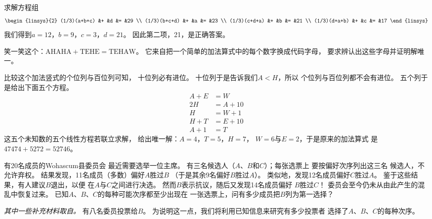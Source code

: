\begin{exercises}
\begin{exparts*}
    \end{exparts*}
    \begin{answer}
      求解方程组
      \begin{equation*}
        \begin{linsys}{2}
        (1/3)(a+b+c)  &+  &d  &=  &29  \\
        (1/3)(b+c+d)  &+  &a  &=  &23  \\
        (1/3)(c+d+a)  &+  &b  &=  &21  \\
        (1/3)(d+a+b)  &+  &c  &=  &17
        \end{linsys}
      \end{equation*}
      我们得到$a=12$，$b=9$，$c=3$，$d=21$。
      因此第二项，21，是正确答案。
     \end{answer}
  \puzzle \item  
      \cite{Monthly35p47}
      笑一笑这个：\( \mbox{AHAHA}+\mbox{TEHE}=\mbox{TEHAW} \)。
      它来自把一个简单的加法算式中的每个数字换成代码字母，
      要求辨认出这些字母并证明解唯一。
      \begin{answer}
        \answerasgiven
        比较这个加法竖式的个位列与百位列可知，
        十位列必有进位。
        十位列于是告诉我们\( A<H \)，所以
        个位列与百位列都不会有进位。
        五个列于是给出下面五个方程。
        \begin{align*}
          A+E  &=  W  \\
          2H   &=  A+10  \\
          H    &=  W+1  \\
          H+T  &=  E+10  \\
          A+1  &=  T
        \end{align*}
        这五个未知数的五个线性方程若联立求解，
        给出唯一解：\( A=4 \)，\( T=5 \)，\( H=7 \)，
        \( W=6 \)与\( E=2 \)，于是原来的加法算式
        是\( 47474+5272=52746 \)。  
      \end{answer}
  \puzzle \item 
     \cite{Wohascum2}
     有20名成员的Wohascum县委员会
     最近需要选举一位主席。
     有三名候选人（$A$、$B$和$C$）；每张选票上
     要按偏好次序列出这三名
     候选人，不允许弃权。
     结果发现，11名成员（多数）偏好$A$胜过$B$
     （于是其余9名偏好$B$胜过$A$）。
     类似地，发现12名成员偏好$C$胜过$A$。
     鉴于这些结果，有人建议$B$退出，以便
     在$A$与$C$之间进行决选。
     然而$B$表示抗议，随后又发现14名成员偏好
     $B$胜过$C$！
     委员会至今仍未从由此产生的混乱中恢复过来。
     已知$A$、$B$、$C$的每种可能次序都至少出现在
     一张选票上，问有多少成员把$B$列为第一选择？
     \begin{answer}
       \answerasgiven{} 
       \textit{其中一些补充材料取自\cite{joriki}。}
       有八名委员投票给$B$。
       为说明这一点，我们将利用已知信息来研究有多少投票者
       选择了$A$、$B$、$C$的每种次序。


\end{answer}
\end{exercises}
